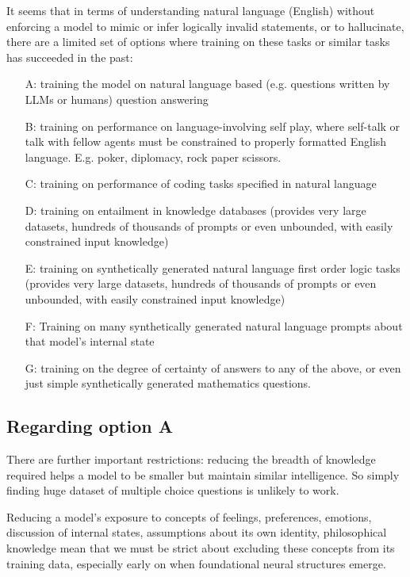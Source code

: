 \documentclass{article}
\begin{document}
It seems that in terms of understanding natural language (English) without enforcing a model to mimic or infer logically invalid statements, or to hallucinate, there are a limited set of options where training on these tasks or similar tasks has succeeded in the past:
\begin{itemize}
    \item[A:] training the model on natural language based (e.g. questions written by LLMs or humans) question answering
    \item[B:] training on performance on language-involving self play, where self-talk or talk with fellow agents must be constrained to properly formatted English language. E.g. poker, diplomacy, rock paper scissors.
    \item[C:] training on performance of coding tasks specified in natural language 
    \item[D:] training on entailment in knowledge databases (provides very large datasets, hundreds of thousands of prompts or even unbounded, with easily constrained input knowledge)
    \item[E:] training on synthetically generated natural language first order logic tasks (provides very large datasets, hundreds of thousands of prompts or even unbounded, with easily constrained input knowledge)
    \item[F:] Training on many synthetically generated natural language prompts about that model's internal state
    \item[G:] training on the degree of certainty of answers to any of the above, or even just simple synthetically generated mathematics questions.
\end{itemize}

\subsection{Regarding option A}

There are further important restrictions: reducing the breadth of knowledge required helps a model to be smaller but maintain similar intelligence. So simply finding huge dataset of multiple choice questions is unlikely to work.

Reducing a model's exposure to concepts of feelings, preferences, emotions, discussion of internal states, assumptions about its own identity, philosophical knowledge mean that we must be strict about excluding these concepts from its training data, especially early on when foundational neural structures emerge.
\end{document}
